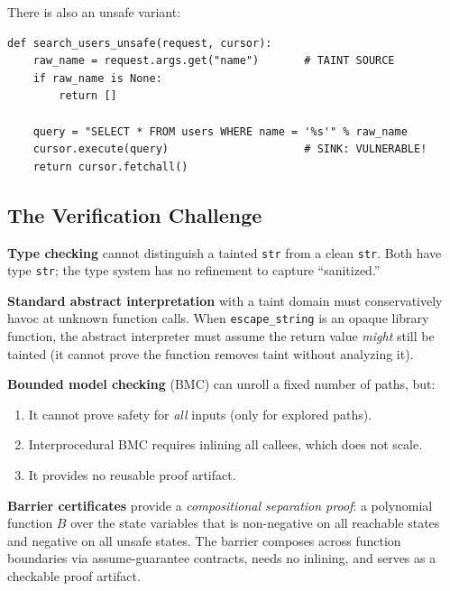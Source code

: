 \documentclass[11pt,a4paper]{article}
\theoremstyle{plain}
\theoremstyle{definition}
\theoremstyle{remark}
\begin{document}
\medskip
There is also an unsafe variant:
\begin{lstlisting}[style=python, caption={Unsafe variant (no sanitizer)}, label=lst:unsafe]
def search_users_unsafe(request, cursor):
    raw_name = request.args.get("name")       # TAINT SOURCE
    if raw_name is None:
        return []

    query = "SELECT * FROM users WHERE name = '%s'" % raw_name
    cursor.execute(query)                     # SINK: VULNERABLE!
    return cursor.fetchall()
\end{lstlisting}

\subsection{The Verification Challenge}

\begin{whybarrier}
\textbf{Type checking} cannot distinguish a tainted \texttt{str} from a
clean \texttt{str}.  Both have type \texttt{str}; the type system has no
refinement to capture ``sanitized.''

\textbf{Standard abstract interpretation} with a taint domain must
conservatively havoc at unknown function calls.  When
\texttt{escape\_string} is an opaque library function, the abstract
interpreter must assume the return value \emph{might} still be tainted
(it cannot prove the function removes taint without analyzing it).

\textbf{Bounded model checking} (BMC) can unroll a fixed number of paths, but:
\begin{enumerate}[nosep]
  \item It cannot prove safety for \emph{all} inputs (only for explored paths).
  \item Interprocedural BMC requires inlining all callees, which does not scale.
  \item It provides no reusable proof artifact.
\end{enumerate}

\textbf{Barrier certificates} provide a \emph{compositional separation
proof}: a polynomial function $B$ over the state variables that is
non-negative on all reachable states and negative on all unsafe states.
The barrier composes across function boundaries via assume-guarantee
contracts, needs no inlining, and serves as a checkable proof artifact.
\end{whybarrier}

\end{document}
